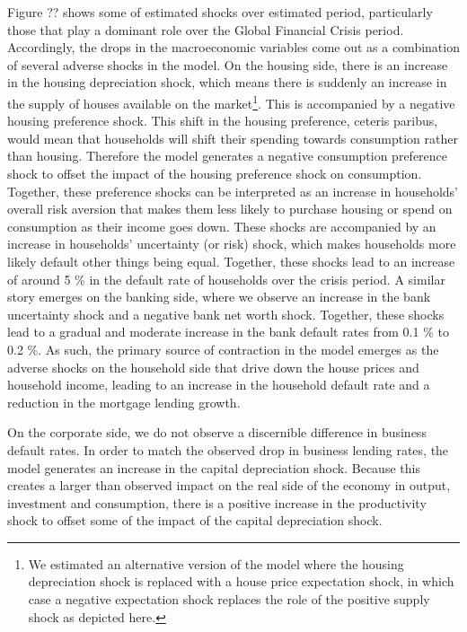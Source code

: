\documentclass[12pt]{article}
\numberwithin{equation}{section}
\begin{document}
Figure ?? shows some of estimated shocks over estimated period, particularly those that play a dominant role over the Global Financial Crisis period. Accordingly, the drops in the macroeconomic variables come out as a combination of several adverse shocks in the model. On the housing side, there is an increase in the housing depreciation shock, which means there is suddenly an increase in the supply of houses available on the market\footnote{We estimated an alternative version of the model where the housing depreciation shock is replaced with a house price expectation shock, in which case a negative expectation shock replaces the role of the positive supply shock as depicted here.}. This is accompanied by a negative housing preference shock. This shift in the housing preference, ceteris paribus, would mean that households will shift their spending towards consumption rather than housing. Therefore the model generates a negative consumption preference shock to offset the impact of the housing preference shock on consumption. Together, these preference shocks can be interpreted as an increase in households' overall risk aversion that makes them less likely to purchase housing or spend on consumption as their income goes down. These shocks are accompanied by an increase in households' uncertainty (or risk) shock, which makes households more likely default other things being equal. Together, these shocks lead to an increase of around 5 \% in the default rate of households over the crisis period. A similar story emerges on the banking side, where we observe an increase in the bank uncertainty shock and a negative bank net worth shock. Together, these shocks lead to a gradual and moderate increase in the bank default rates from  0.1 \% to 0.2 \%. As such, the primary source of contraction in the model emerges as the adverse shocks on the household side that drive down the house prices and household income, leading to an increase in the household default rate and a reduction in the mortgage lending growth.

On the corporate side, we do not observe a discernible difference in business default rates. In order to match the observed drop in business lending rates, the model generates an increase in the capital depreciation shock. Because this creates a larger than observed impact on the real side of the economy in output, investment and consumption, there is a positive increase in the productivity shock to offset some of the impact of the capital depreciation shock. 
\end{document}
